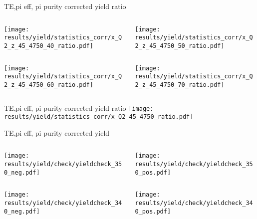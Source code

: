 \begin{frame}{TE,pi eff, pi purity corrected yield ratio}
\begin{columns}
\begin{column}[T]{0.5\textwidth}
\texttt{[image: results/yield/statistics\_corr/x\_Q2\_z\_45\_4750\_40\_ratio.pdf]}
\end{column}
\begin{column}[T]{0.5\textwidth}
\texttt{[image: results/yield/statistics\_corr/x\_Q2\_z\_45\_4750\_50\_ratio.pdf]}
\end{column}
\end{columns}
\begin{columns}
\begin{column}[T]{0.5\textwidth}
\texttt{[image: results/yield/statistics\_corr/x\_Q2\_z\_45\_4750\_60\_ratio.pdf]}
\end{column}
\begin{column}[T]{0.5\textwidth}
\texttt{[image: results/yield/statistics\_corr/x\_Q2\_z\_45\_4750\_70\_ratio.pdf]}
\end{column}
\end{columns}
\end{frame}
\begin{frame}{TE,pi eff, pi purity corrected yield ratio}
\texttt{[image: results/yield/statistics\_corr/x\_Q2\_45\_4750\_ratio.pdf]}
\end{frame}
\begin{frame}{TE,pi eff, pi purity corrected yield}
\begin{columns}
\begin{column}[T]{0.5\textwidth}
\texttt{[image: results/yield/check/yieldcheck\_350\_neg.pdf]}
\end{column}
\begin{column}[T]{0.5\textwidth}
\texttt{[image: results/yield/check/yieldcheck\_350\_pos.pdf]}
\end{column}
\end{columns}
\begin{columns}
\begin{column}[T]{0.5\textwidth}
\texttt{[image: results/yield/check/yieldcheck\_340\_neg.pdf]}
\end{column}
\begin{column}[T]{0.5\textwidth}
\texttt{[image: results/yield/check/yieldcheck\_340\_pos.pdf]}
\end{column}
\end{columns}
\end{frame}
